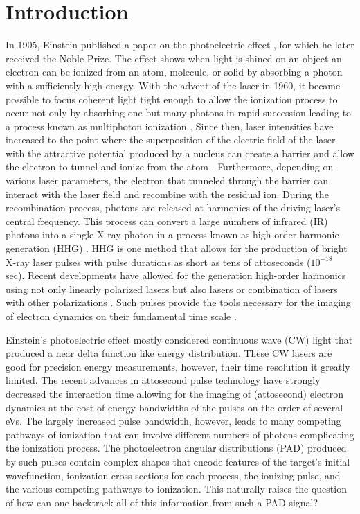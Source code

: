 \chapter{Introduction}
\label{cha:introchap}

In 1905, Einstein published a paper on the photoelectric effect \cite{einstein1905}, for which he later received the Noble Prize. The effect shows when light is shined on an object an electron can be ionized from an atom, molecule, or solid by absorbing a photon with a sufficiently high energy. With the advent of the laser in 1960, it became possible to focus coherent light tight enough to allow the ionization process to occur not only by absorbing one but many photons in rapid succession leading to a process known as multiphoton ionization \cite{goppertmayer1931}. Since then, laser intensities have increased to the point where the superposition of the electric field of the laser with the attractive potential produced by a nucleus can create a barrier and allow the electron to tunnel and ionize from the atom \cite{keldysh1965}. Furthermore, depending on various laser parameters, the electron that tunneled through the barrier can interact with the laser field and recombine with the residual ion. During the recombination process, photons are released at harmonics of the driving laser's central frequency. This process can convert a large numbers of infrared (IR) photons into a single X-ray photon in a process known as high-order harmonic generation (HHG) \cite{franken1961,lewenstein1994,corkum1994}. HHG is one method that allows for the production of bright X-ray laser pulses with pulse durations as short as tens of attoseconds \cite{zhao2012,chen2014} ($10^{-18}$ sec). Recent developments have allowed for the generation high-order harmonics using not only linearly polarized lasers but also lasers or combination of lasers with other polarizations \cite{fleischer2014,pisanty2014,kfir2015,fan2015,hickstein2015}. Such pulses provide the tools necessary for the imaging of electron dynamics on their fundamental time scale \cite{krausz2009}. 

Einstein's photoelectric effect mostly considered continuous wave (CW) light that produced a near delta function like energy distribution. These CW lasers are good for precision energy measurements, however, their time resolution it greatly limited. The recent advances in attosecond pulse technology have strongly decreased the interaction time allowing for the imaging of (attosecond) electron dynamics at the cost of energy bandwidths of the pulses on the order of several eVs. The largely increased pulse bandwidth, however, leads to many competing pathways of ionization that can involve different numbers of photons complicating the ionization process. The photoelectron angular distributions (PAD) produced by such pulses contain complex shapes that encode features of the target's initial wavefunction, ionization cross sections for each process, the ionizing pulse, and the various competing pathways to ionization. This naturally raises the question of how can one backtrack all of this information from such a PAD signal?

